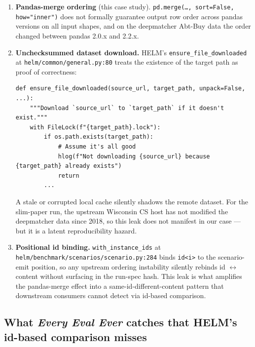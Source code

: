\documentclass[11pt]{article}
\newcommand{\eee}{\textit{Every Eval Ever}\xspace}
\begin{document}
\begin{enumerate}
  \item \textbf{Pandas-merge ordering} (this case study).
        \texttt{pd.merge(\ldots, sort=False, how="inner")} does not
        formally guarantee output row order across pandas versions on
        all input shapes, and on the deepmatcher Abt-Buy data the
        order changed between pandas 2.0.x and 2.2.x.
  \item \textbf{Unchecksummed dataset download.}
        HELM's \texttt{ensure\_file\_downloaded} at
        \texttt{helm/common/general.py:80} treats the existence of the
        target path as proof of correctness:

        \begin{lstlisting}[style=python, caption={\texttt{helm/common/general.py:80} (excerpt).\label{lst:tr-helm-ensure-file-downloaded}}]
def ensure_file_downloaded(source_url, target_path, unpack=False, ...):
    """Download `source_url` to `target_path` if it doesn't exist."""
    with FileLock(f"{target_path}.lock"):
        if os.path.exists(target_path):
            # Assume it's all good
            hlog(f"Not downloading {source_url} because {target_path} already exists")
            return
        ...
        \end{lstlisting}

        A stale or corrupted local cache silently shadows the remote
        dataset.
        For the slim-paper run, the upstream Wisconsin CS host has
        not modified the deepmatcher data since 2018, so this leak
        does not manifest in our case --- but it is a latent
        reproducibility hazard.
  \item \textbf{Positional id binding.}
        \texttt{with\_instance\_ids} at
        \texttt{helm/benchmark/scenarios/scenario.py:284} binds
        \texttt{id<i>} to the scenario-emit position, so any upstream
        ordering instability silently rebinds id $\leftrightarrow$
        content without surfacing in the run-spec hash.
        This leak is what amplifies the pandas-merge effect into a
        same-id-different-content pattern that
        downstream consumers cannot detect via id-based comparison.
\end{enumerate}

\subsection{What \eee{} catches that HELM's id-based comparison misses}
\label{sec:tr-case-a-eee-catches}
\end{document}
